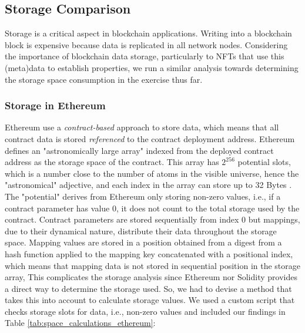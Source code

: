 \documentclass[../NFTComp_IEEE.tex]{subfiles}
\begin{document}
\subsection{Storage Comparison}
Storage is a critical aspect in blockchain applications. Writing into a blockchain block is expensive because data is replicated in all network nodes. Considering the importance of blockchain data storage, particularly to NFTs that use this (meta)data to establish properties, we run a similar analysis towards determining the storage space consumption in the exercise thus far.

\subsubsection{Storage in Ethereum}
Ethereum use a \textit{contract-based} approach to store data, which means that all contract data is stored \textit{referenced} to the contract deployment address. Ethereum defines an "astronomically large array" indexed from the deployed contract address as the storage space of the contract. This array has $ 2^{256} $ potential slots, which is a number close to the number of atoms in the visible universe, hence the "astronomical" adjective, and each index in the array can store up to 32 Bytes \cite{Marx2018}. The "potential" derives from Ethereum only storing non-zero values, i.e., if a contract parameter has value 0, it does not count to the total storage used by the contract. Contract parameters are stored sequentially from index 0 but mappings, due to their dynamical nature, distribute their data throughout the storage space. Mapping values are stored in a position obtained from a digest from a hash function applied to the mapping key concatenated with a positional index, which means that mapping data is not stored in sequential position in the storage array,
This complicates the storage analysis since Ethereum nor Solidity provides a direct way to determine the storage used. So, we had to devise a method that takes this into account to calculate storage values. We used a custom script that checks storage slots for data, i.e., non-zero values and included our findings in Table \ref{tab:space_calculations_ethereum}:
\end{document}
